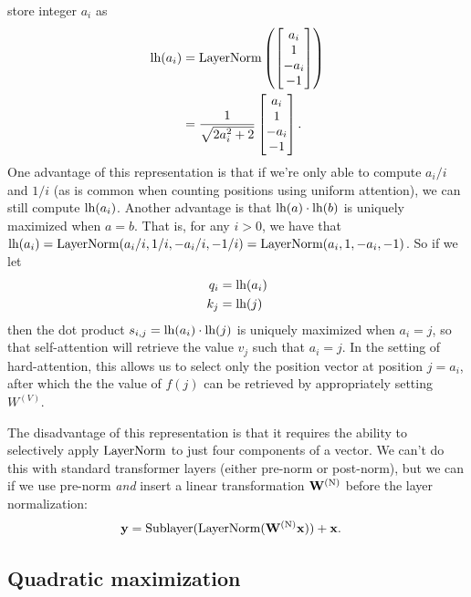  store integer $a_i$ as
\begin{align*}
  \textnormal{lh}(a_i) &= \textnormal{LayerNorm}\left(\begin{bmatrix} a_i \\ 1 \\ -a_i \\ -1 \end{bmatrix}\right) \\
  &= \frac1{\sqrt{2a_i^2+2}} \begin{bmatrix} a_i \\ 1 \\ -a_i \\ -1 \end{bmatrix}.
\end{align*}
One advantage of this representation is that if we're only able to compute $a_i/i$ and $1/i$ (as is common when counting positions using uniform attention), we can still compute $\textnormal{lh}(a_i)$. Another advantage is that $\textnormal{lh}(a)\cdot\textnormal{lh}(b)$ is uniquely maximized when $a=b$. That is, for any $i>0$, we have that $\textnormal{lh}(a_i)=\textnormal{LayerNorm}(a_i/i,1/i,-a_i/i,-1/i) = \textnormal{LayerNorm}(a_i,1,-a_i,-1)$. So if we let
\begin{align*}
  q_i &= \textnormal{lh}(a_i) \\
  k_j &= \textnormal{lh}(j)
\end{align*}
then the dot product $s_{i,j} = \textnormal{lh}(a_i) \cdot \textnormal{lh}(j)$ is uniquely maximized when $a_i = j$, so that self-attention will retrieve the value $v_j$ such that $a_i = j$. In the setting of hard-attention, this allows us to select only the position vector at position $j=a_i$, after which the the value of $f(j)$ can be retrieved by appropriately setting $W^{(V)}$.

The disadvantage of this representation is that it requires the ability to selectively apply $\textnormal{LayerNorm}$ to just four components of a vector. We can't do this with standard transformer layers (either pre-norm or post-norm), but we can if we use pre-norm \emph{and} insert a linear transformation $\mathbf{W}^{(\textnormal{N})}$ before the layer normalization:
\begin{align*}
  \mathbf{y} &= \textnormal{Sublayer}(\textnormal{LayerNorm}(\mathbf{W}^{(\textnormal{N})} \mathbf{x})) + \mathbf{x}.
\end{align*}

\subsection{Quadratic maximization}

